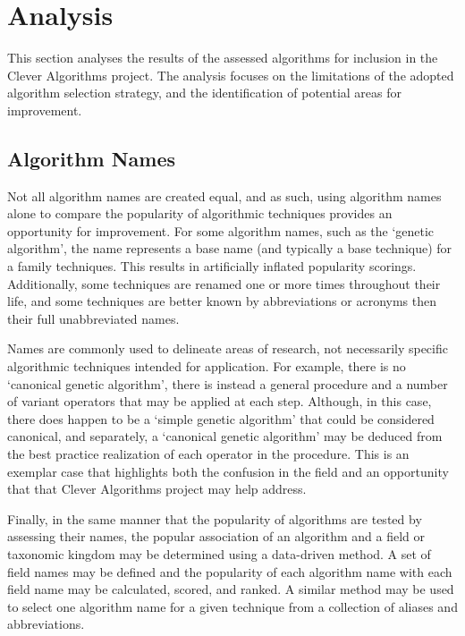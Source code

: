 \documentclass[a4paper, 11pt]{article}
\begin{document}
% 
% 
\section{Analysis}
\label{sec:analysis}
This section analyses the results of the assessed algorithms for inclusion in the Clever Algorithms project. The analysis focuses on the limitations of the adopted algorithm selection strategy, and the identification of potential areas for improvement.

\subsection{Algorithm Names}
Not all algorithm names are created equal, and as such, using algorithm names alone to compare the popularity of algorithmic techniques provides an opportunity for improvement. For some algorithm names, such as the `genetic algorithm', the name represents a base name (and typically a base technique) for a family techniques. This results in artificially inflated popularity scorings. Additionally, some techniques are renamed one or more times throughout their life, and some techniques are better known by abbreviations or acronyms then their full unabbreviated names.

Names are commonly used to delineate areas of research, not necessarily specific algorithmic techniques intended for application. For example, there is no `canonical genetic algorithm', there is instead a general procedure and a number of variant operators that may be applied at each step. Although, in this case, there does happen to be a `simple genetic algorithm' that could be considered canonical, and separately, a `canonical genetic algorithm' may be deduced from the best practice realization of each operator in the procedure. This is an exemplar case that highlights both the confusion in the field and an opportunity that that Clever Algorithms project may help address.

Finally, in the same manner that the popularity of algorithms are tested by assessing their names, the popular association of an algorithm and a field or taxonomic kingdom may be determined using a data-driven method. A set of field names may be defined and the popularity of each algorithm name with each field name may be calculated, scored, and ranked. A similar method may be used to select one algorithm name for a given technique from a collection of aliases and abbreviations.

\end{document}

